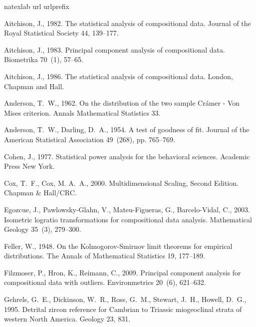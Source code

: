 \documentclass[authoryear,preprint,review,12pt]{elsarticle}
\begin{document}
\begin{thebibliography}{19}
\expandafter\ifx\csname natexlab\endcsname\relax\def\natexlab#1{#1}\fi
\expandafter\ifx\csname url\endcsname\relax
  \def\url#1{\texttt{#1}}\fi
\expandafter\ifx\csname urlprefix\endcsname\relax\def\urlprefix{URL }\fi

Aitchison, J., 1982. The statistical analysis of compositional data. Journal of
  the Royal Statistical Society 44, 139--177.

Aitchison, J., 1983. Principal component analysis of compositional data.
  Biometrika 70~(1), 57--65.

Aitchison, J., 1986. The statistical analysis of compositional data. London,
  Chapman and Hall.

Anderson, T.~W., 1962. {On the distribution of the two sample Cr\'{a}mer - Von
  Mises criterion}. Annals Mathematical Statistics 33.

Anderson, T.~W., Darling, D.~A., 1954. A test of goodness of fit. Journal of
  the American Statistical Association 49~(268), pp. 765--769.

Cohen, J., 1977. {Statistical power analysis for the behavioral sciences}.
  Academic Press New York.

Cox, T.~F., Cox, M. A.~A., 2000. {Multidimensional Scaling, Second Edition}.
  {Chapman \& Hall/CRC}.

Egozcue, J., Pawlowsky-Glahn, V., Mateu-Figueras, G., Barcelo-Vidal, C., 2003.
  Isometric logratio transformations for compositional data analysis.
  Mathematical Geology 35~(3), 279--300.

Feller, W., 1948. On the {K}olmogorov-{S}mirnov limit theorems for empirical
  distributions. The Annals of Mathematical Statistics 19, 177--189.

Filzmoser, P., Hron, K., Reimann, C., 2009. Principal component analysis for
  compositional data with outliers. Environmetrics 20~(6), 621--632.

{Gehrels}, G.~E., {Dickinson}, W.~R., {Ross}, G.~M., {Stewart}, J.~H.,
  {Howell}, D.~G., 1995. {Detrital zircon reference for Cambrian to Triassic
  miogeoclinal strata of western North America}. Geology 23, 831.


\end{thebibliography}
\end{document}
